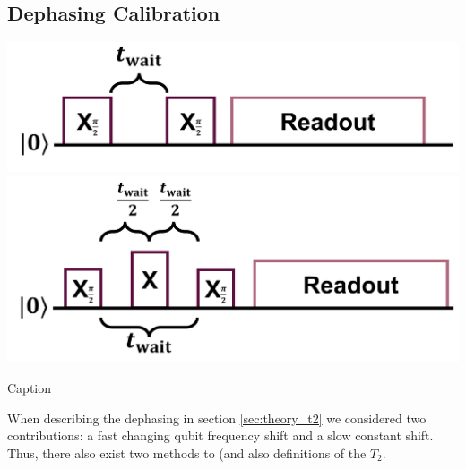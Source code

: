 \subsection{Dephasing Calibration}
\begin{marginfigure}
    \centering
    \includegraphics{Figs/circuits/t2.png}
    \includegraphics{Figs/circuits/t2_echo.png}
    \caption{Caption}
    \label{fig:enter-label}
\end{marginfigure}

When describing the dephasing in section \ref{sec:theory_t2} we considered two contributions: a fast changing qubit frequency shift and a slow constant shift. Thus, there also exist two methods to (and also definitions of the $T_2$. 


